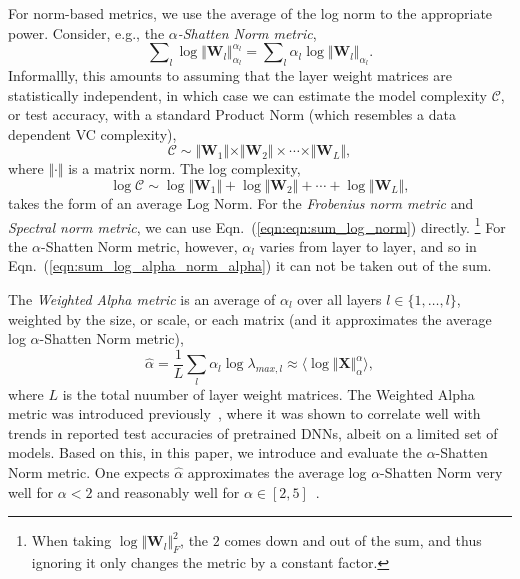 For norm-based metrics, we use the average of the log norm to the appropriate power.
Consider, e.g., the \emph{$\alpha$-Shatten Norm metric}, 
\begin{equation}
\label{eqn:sum_log_alpha_norm_alpha}
\sum\nolimits_l \log \Vert\mathbf{W}_l\Vert_{\alpha_l}^{\alpha_l} 
=
\sum\nolimits_l \alpha_l \log \Vert\mathbf{W}_l\Vert_{\alpha_l} .
\end{equation}
Informallly, this amounts to assuming that the layer weight matrices are statistically independent, in which case we can estimate the model complexity $\mathcal{C}$, or test accuracy, with a standard Product Norm (which resembles a data dependent VC complexity),
\begin{equation}
\mathcal{C}\sim\Vert\mathbf{W}_{1}\Vert\times\Vert\mathbf{W}_{2}\Vert \times \cdots \times \Vert\mathbf{W}_{L}\Vert ,
\end{equation}
where $\Vert\cdot\Vert$ is a matrix norm.   
The log complexity,
\begin{equation}
\label{eqn:eqn:sum_log_norm}
\log\mathcal{C} \sim \log\Vert\mathbf{W}_{1}\Vert+\log\Vert\mathbf{W}_{2}\Vert + \cdots + \log\Vert\mathbf{W}_{L}\Vert  ,
\end{equation}
 takes the form of an average Log Norm.
For the \emph{Frobenius norm metric} and \emph{Spectral norm metric}, we can use Eqn.~(\ref{eqn:eqn:sum_log_norm}) directly.%
\footnote{When taking $\log\Vert\mathbf{W}_{l}\Vert_{F}^{2}$, the $2$ comes down and out of the sum, and thus ignoring it only changes the metric by a constant factor.}
For the $\alpha$-Shatten Norm metric, however, $\alpha_l$ varies from layer to layer, and so in Eqn.~(\ref{eqn:sum_log_alpha_norm_alpha}) it can not be taken out of the sum.


The \emph{Weighted Alpha metric} is an average of $\alpha_l$ over all layers $l \in \{1,\ldots,l\}$, weighted by the size, or scale, or each matrix
(and it approximates the average log $\alpha$-Shatten Norm metric),
\begin{equation}
\hat{\alpha} = \dfrac{1}{L}\sum_l \alpha_l\log\lambda_{max,l}\approx\langle\log\Vert\mathbf{X}\Vert_{\alpha}^{\alpha}\rangle    ,
\end{equation}
where $L$ is the total nuumber of layer weight matrices.
The Weighted Alpha metric was introduced previously~\cite{MM20_SDM}, where it was shown to correlate well with trends in reported test accuracies of pretrained DNNs, albeit on a limited set of models.
Based on this, in this paper, we introduce and evaluate the $\alpha$-Shatten Norm metric.
One expects $\hat{\alpha}$ approximates the average log $\alpha$-Shatten Norm very well for $\alpha < 2$ and reasonably well for $\alpha\in[2,5]$~\cite{MM20_unpub_work}.  

